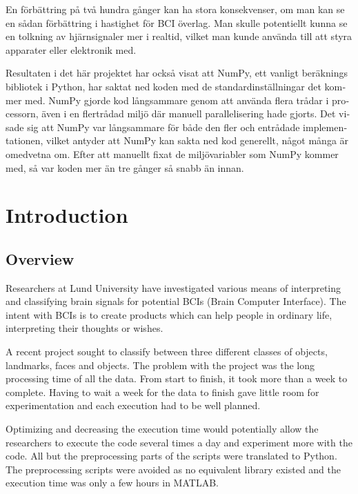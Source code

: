 \documentclass[12pt, a4paper]{article}
\begin{document}
\begin{otherlanguage}{swedish}
En förbättring på två hundra gånger kan ha stora konsekvenser, om man kan se en sådan förbättring i hastighet för BCI överlag.
Man skulle potentiellt kunna se en tolkning av hjärnsignaler mer i realtid, vilket man kunde använda till att styra apparater eller elektronik med.

Resultaten i det här projektet har också visat att NumPy, ett vanligt beräknings bibliotek i Python, har saktat ned koden med de standardinställningar det kommer med.
NumPy gjorde kod långsammare genom att använda flera trådar i processorn, även i en flertrådad miljö där manuell parallelisering hade gjorts.
Det visade sig att NumPy var långsammare för både den fler och entrådade implementationen, vilket antyder att NumPy kan sakta ned kod generellt, något många är omedvetna om.
Efter att manuellt fixat de miljövariabler som NumPy kommer med, så var koden mer än tre gånger så snabb än innan.

\end{otherlanguage}

\tableofcontents


\glsaddall
\renewcommand*{\arraystretch}{1.1}
\printglossary[type=main,style=long,nonumberlist]

\newpage

\section{Introduction}

\subsection{Overview}

Researchers at Lund University have investigated various means of interpreting and classifying brain signals for potential BCIs (Brain Computer Interface). 
The intent with BCIs is to create products which can help people in ordinary life, interpreting their thoughts or wishes.

A recent project sought to classify between three different classes of objects, landmarks, faces and objects.
The problem with the project was the long processing time of all the data.
From start to finish, it took more than a week to complete.
Having to wait a week for the data to finish gave little room for experimentation and each execution had to be well planned.

Optimizing and decreasing the execution time would potentially allow the researchers to execute the code several times a day and experiment more with the code.
All but the preprocessing parts of the scripts were translated to Python.
The preprocessing scripts were avoided as no equivalent library existed and the execution time was only a few hours in MATLAB.
\end{document}
